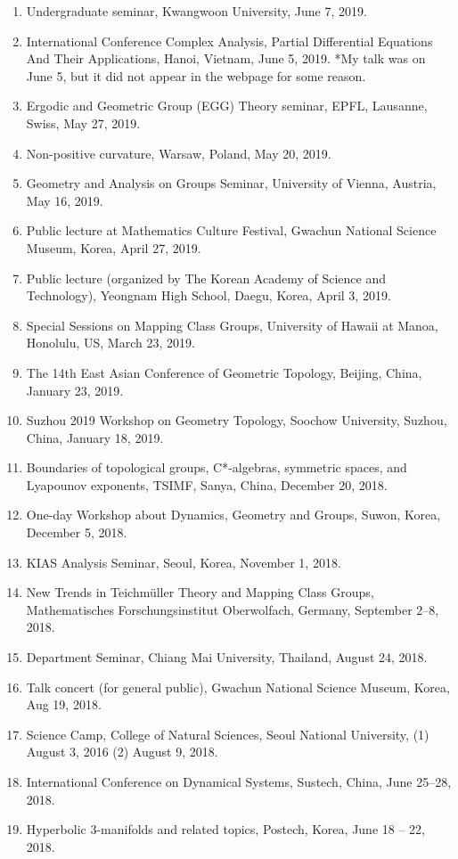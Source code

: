 \documentclass[11pt,a4paper]{article}
\begin{document}
\begin{enumerate}[leftmargin=1.5em, label=\arabic*.]
\item Undergraduate seminar, Kwangwoon University, June 7, 2019.
\item International Conference Complex Analysis, Partial Differential Equations And Their Applications, Hanoi, Vietnam, June 5, 2019. *My talk was on June 5, but it did not appear in the webpage for some reason.
\item Ergodic and Geometric Group (EGG) Theory seminar, EPFL, Lausanne, Swiss, May 27, 2019.
\item Non-positive curvature, Warsaw, Poland, May 20, 2019.
\item Geometry and Analysis on Groups Seminar, University of Vienna, Austria, May 16, 2019.
\item Public lecture at Mathematics Culture Festival, Gwachun National Science Museum, Korea, April 27, 2019.
\item Public lecture (organized by The Korean Academy of Science and Technology), Yeongnam High School, Daegu, Korea, April 3, 2019.
\item Special Sessions on Mapping Class Groups, University of Hawaii at Manoa, Honolulu, US, March 23, 2019.
\item The 14th East Asian Conference of Geometric Topology, Beijing, China, January 23, 2019.
\item Suzhou 2019 Workshop on Geometry Topology, Soochow University, Suzhou, China, January 18, 2019.
\item Boundaries of topological groups, C*-algebras, symmetric spaces, and Lyapounov exponents, TSIMF, Sanya, China, December 20, 2018.
\item One-day Workshop about Dynamics, Geometry and Groups, Suwon, Korea, December 5, 2018.
\item KIAS Analysis Seminar, Seoul, Korea, November 1, 2018.
\item New Trends in Teichmüller Theory and Mapping Class Groups, Mathematisches Forschungsinstitut Oberwolfach, Germany, September 2--8, 2018.
\item Department Seminar, Chiang Mai University, Thailand, August 24, 2018.
\item Talk concert (for general public), Gwachun National Science Museum, Korea, Aug 19, 2018.
\item Science Camp, College of Natural Sciences, Seoul National University, (1) August 3, 2016 (2) August 9, 2018.
\item International Conference on Dynamical Systems, Sustech, China, June 25--28, 2018.
\item Hyperbolic 3-manifolds and related topics, Postech, Korea, June 18 -- 22, 2018.

\end{enumerate}
\end{document}
